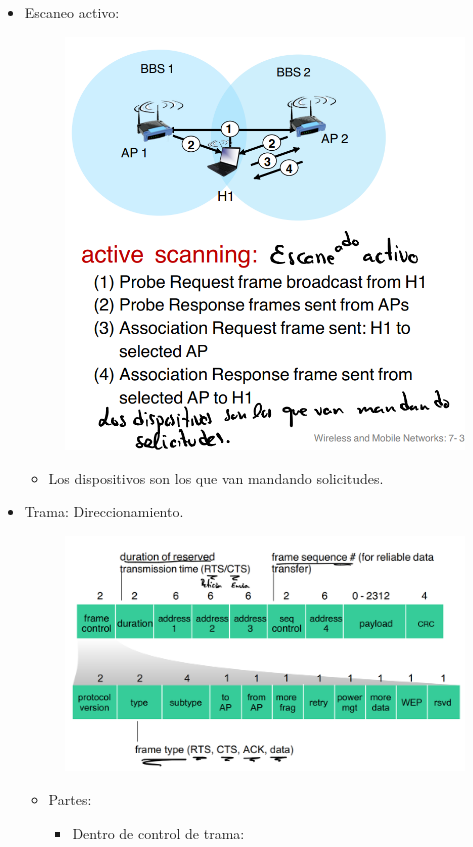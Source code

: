 \documentclass[12pt, twoside, openright]{report} %
\begin{document}
\begin{itemize}
\begin{itemize}
  \item Escaneo activo:
  \begin{figure}[H]
    {\includegraphics[scale=.2]{Untitled 62.png}}
  \end{figure}
  \begin{itemize}
    \item Los dispositivos son los que van mandando solicitudes.
  \end{itemize}

  \item Trama: Direccionamiento.
  \begin{figure}[H]
    {\includegraphics[scale=.2]{Untitled 63.png}}
  \end{figure}
  \begin{itemize}
    \item Partes:
    \begin{itemize}
      \item Dentro de control de trama:
      

\end{itemize}
\end{itemize}
\end{itemize}
\end{itemize}
\end{document}
